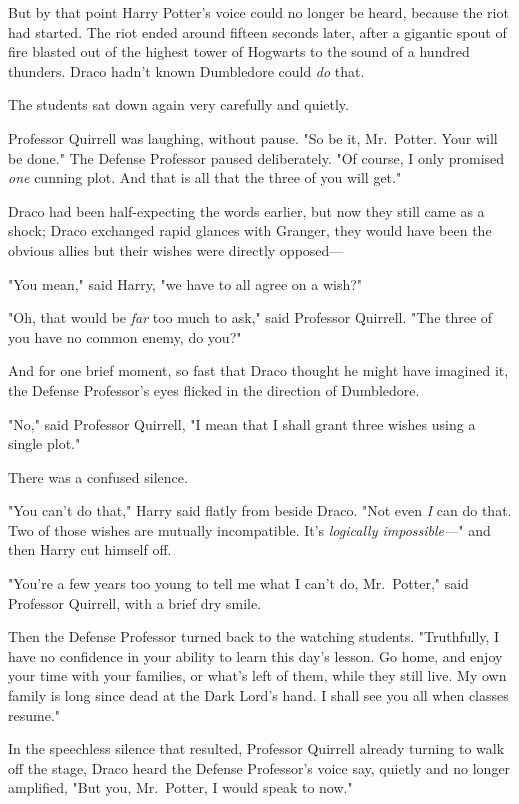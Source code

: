 But by that point Harry Potter's voice could no longer be heard, because the 
riot had started.
\sbreak
The riot ended around fifteen seconds later, after a gigantic spout of fire 
blasted out of the highest tower of Hogwarts to the sound of a hundred 
thunders. Draco hadn't known Dumbledore could \emph{do} that.

The students sat down again very carefully and quietly.

Professor Quirrell was laughing, without pause. "So be it, Mr.~Potter. Your 
will be done." The Defense Professor paused deliberately. "Of course, I only 
promised \emph{one} cunning plot. And that is all that the three of you will 
get."

Draco had been half-expecting the words earlier, but now they still came as a 
shock; Draco exchanged rapid glances with Granger, they would have been the 
obvious allies but their wishes were directly opposed---

"You mean," said Harry, "we have to all agree on a wish?"

"Oh, that would be \emph{far} too much to ask," said Professor Quirrell. "The 
three of you have no common enemy, do you?"

And for one brief moment, so fast that Draco thought he might have imagined it, 
the Defense Professor's eyes flicked in the direction of Dumbledore.

"No," said Professor Quirrell, "I mean that I shall grant three wishes using a 
single plot."

There was a confused silence.

"You can't do that," Harry said flatly from beside Draco. "Not even \emph{I} 
can do that. Two of those wishes are mutually incompatible. It's 
\emph{logically impossible---}" and then Harry cut himself off.

"You're a few years too young to tell me what I can't do, Mr.~Potter," said 
Professor Quirrell, with a brief dry smile.

Then the Defense Professor turned back to the watching students. "Truthfully, I 
have no confidence in your ability to learn this day's lesson. Go home, and 
enjoy your time with your families, or what's left of them, while they still 
live. My own family is long since dead at the Dark Lord's hand. I shall see you 
all when classes resume."

In the speechless silence that resulted, Professor Quirrell already turning to 
walk off the stage, Draco heard the Defense Professor's voice say, quietly and 
no longer amplified, "But you, Mr.~Potter, I would speak to now."
